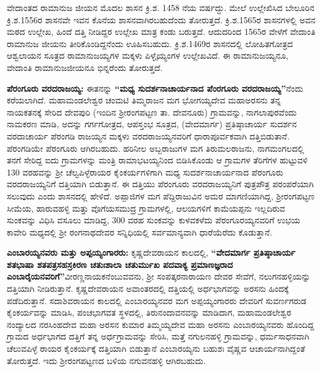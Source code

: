 ವೇದಾಂತದ ರಾಮಾನುಜ ಜೀಯನ ಮೊದಲ ಶಾಸನ ಕ್ರಿ.ಶ. 1458 ನೆಯ ವರ್ಷದ್ದು. ಮೇಲೆ ಉಲ್ಲೇಖಿಸಿದ ಬೇಲೂರಿನ ಕ್ರಿ.ಶ.1556ರ ಶಾಸನವೇ ಇವನ ಕೊನೆಯ ಶಾಸನವಾಗಿರಬಹುದೆಂದು ತೋರುತ್ತದೆ. ಕ್ರಿ.ಶ.1565ರ ಶಾಸನಗಳಲ್ಲಿ ಅವನ ಮಠದ ಉಲ್ಲೇಖ, ಹಿಂದೆ ದತ್ತಿ ನೀಡಿದ್ದರ ಉಲ್ಲೇಖ ಮಾತ್ರ ಕಂಡು ಬರುತ್ತದೆ. ಆದುದರಿಂದ 1565ರ ವೇಳೆಗೆ ವೇದಾಂತಿ ರಾಮಾನುಜ ಜೀಯನು ತೀರಿಕೊಂಡಿದ್ದನೆಂದು ಊಹಿಸಬಹುದು. ಕ್ರಿ.ಶ.1469ರ ಶಾಸನದಲ್ಲಿ ಲೋಹಿತಗೋತ್ರದ ಆಶ್ವಲಾಯನ ಸೂತ್ರದ ರಾಮಾನುಜಯ್ಯಗಳ ಮಕ್ಕಳು ಪಿಳ್ಳೈಯ್ಯಂಗಳ ಉಲ್ಲೇಖವಿದೆ. ಈ ರಾಮಾನುಜಯ್ಯನೂ, ವೇದಾಂತಿ ರಾಮಾನುಜಜೀಯನೂ ಭಿನ್ನರೆಂದು ತೋರುತ್ತದೆ.

\textbf{ಪೆರಂಗೂರು ವರದರಾಜಯ್ಯ:} ಈತನನ್ನು \textbf{“ಮಧ್ಯ ಸುದರ್ಶನಾಚಾರ್ಯನಾದ ಪೆಂರಗೂರು ವರದರಾಜಯ್ಯ”}ನೆಂದು ಕರೆಯಲಾಗಿದೆ. ಮಹಾಮಂಡಲೇಶ್ವರ ಚಂಮಟಿ ತಿಮ್ಮರಾಜನ ಮಗ ಭೋಗಯ್ಯದೇವ ಮಹಾಅರಸನು ತನ್ನ ನಾಯಕತನಕ್ಕೆ ಸೇರಿದ ದೇವಪುರಿ (ಇಂದಿನ ಶ‍್ರೀರಂಗಪಟ್ಟಣ ತಾ. ದೇವನೂರು) ಗ್ರಾಮವನ್ನು, ನಾಗಲಾಪುರವೆಂದು ನಾಮಕರಣ ಮಾಡಿ, ಅದನ್ನು ಗರ್ಗಗೋತ್ರದ, ಆಪಸ್ತಂಭ ಸೂತ್ರದ, (ವೇದಮಾರ್ಗ) ಪ್ರತಿಷ್ಠಾಚಾರ್ಯ ಸುದರ್ಶನ ವರದಾಚಾರ್ಯ ಪೆರಂಗಡಿ ರಾಜಯ್ಯನ ಮಕ್ಕಳು ವರದರಾಜಯ್ಯನವರಿಗೆ ಧಾರಾಪೂರ್ವಕವಾಗಿ ದತ್ತಿಬಿಡುತಾನೆ. ಪೆರಂಗಡಿಯೇ ಪೆರಂಗೂರು ಆಗಿರಬಹುದು. ಹರಿನೀಲ ಅಬ್ಬರಾಜುಗಳ ಮಗ ತಿರುಮಲರಾಜನು, ನಾಗಮಂಗಲದಲ್ಲಿ ತನಗೆ ಸೇರಿದ್ದ ಐದು ಗ್ರಾಮಗಳನ್ನು ಮಂತ್ರಿ ರಾಮಾಭಟಯ್ಯನಿಂದ ಬಿಡಿಸಿಕೊಂಡು ಆ ಗ್ರಾಮಗಳ ತೆರಿಗೆಗಳ ಹುಟ್ಟುವಳಿ 130 ವರಹವನ್ನು ಶ‍್ರೀ ಚೆಲ್ವಪಿಳ್ಳೆರಾಯರ ಕೈಂಕರ್ಯಗಳಿಗಾಗಿ ಮಧ್ಯ ಸುದರ್ಶನಾಚಾರ್ಯನಾದ ಪೆರಂಗೂರು ವರದರಾಜಯ್ಯನಿಗೆ ದತ್ತಿಯಾಗಿ ಬಿಡುತ್ತಾನೆ. ಈ ದತ್ತಿಯು ಪೆರಂಗೂರು ವರದರಾಜಯ್ಯನಿಗೆ ಪುತ್ರಪೌತ್ರ ಪರಂಪರೆಯಾಗಿ ಸಲುವುದು ಎಂದು ಶಾಸನದಲ್ಲಿ ಹೇಳಿದೆ. ಅಪ್ಪಾಜಿಗಳ ಮಗ ಪೆದ್ದಿರಾಜುವಿನ ಅಮರ ಮಾಗಣಿಯಾಗಿದ್ದ, ಶ‍್ರೀರಂಗಪಟ್ಟಣ ಸೀಮೆಯ, ಹಾರುವಹಳ್ಳಿ ಮತ್ತು ವೊಗೆಯಸಮುದ್ರ ಗ್ರಾಮಗಳಲ್ಲಿ, ಆಲಯಗಳಿಗೆ ಕಾಮೆಯಪ್ಪನು ಇಲ್ಲದಿರುವ ಸುಂಕವನ್ನು ವಿಧಿಸಿ ವಸೂಲು ಮಾಡಿದ್ದ, 300 ವರಹ ಸುಂಕವನ್ನು ಕುಳವಕಳೆದು ಪೆರಂಗೂರಯ್ಯನವರಿಗೆ ಉಭಯ ಕಾವೇರಿ ಮಧ್ಯದಲ್ಲಿ ಶ‍್ರೀ ರಂಗನಾಥದೇವರ ಸನ್ನಿಧಿಯಲ್ಲಿ ಸರ್ವಮಾನ್ಯವಾಗಿ ಧಾರೆಯೆರೆದು ಕೊಡುತ್ತಾನೆ.

\textbf{ಎಂಬಾರಯ್ಯನವರು ಮತ್ತು ಅಪ್ಪಯ್ಯಂಗಾರರು:} ಕೃಷ್ಣದೇವರಾಯನ ಕಾಲದಲ್ಲಿ, \textbf{“ವೇದಮಾರ್ಗ ಪ್ರತಿಷ್ಠಾಚಾರ್ಯ ಶತಭಾಷಾ ಶತಪತ್ರಸಹಸ್ರಕಿರಣ ಚತುಃಶಾಲಾ ಚತುರ್ಮುಖ ಪದವಾಕ್ಯ ಪ್ರಮಾಣಜ್ಞರಾದ ಎಂಬಾರೈಯನವರಿಗೆ”}\break ವೀರಣ್ಣನಾಯಕನೆಂಬುವವನು, ಶ‍್ರೀ ಸಂಪತ್ಕರನಾರಾಯಣ ದೇವರ ಸೇವೆಗೆ, ನಲುಗನಹಳ್ಳಿಯನ್ನು ದತ್ತಿಯಾಗಿ ನೀಡಿರುತ್ತಾನೆ. ಕೃಷ್ಣದೇವರಾಯನ ಅವಾಂತರದಲ್ಲಿ ದತ್ತಿಯಲ್ಲಿ ಅರ್ಧಭಾಗವನ್ನು ಅರಸನು ಹಿಂದಕ್ಕೆ ಪಡೆದಿರುತ್ತಾನೆ. ಸದಾಶಿವರಾಯನ ಕಾಲದಲ್ಲಿ ಎಂಬಾರಯ್ಯನವರ ಮಗ ಅಪ್ಪಯ್ಯಂಗಾರರು ದೇವರಿಗೆ ಸುವರ್ಣಗರುಡ ಕೈಂಕರ್ಯವನ್ನು ಮಾಡಿಸಿ, ಪಂಚಭಾಗವತ ಸ್ಥಳದಲ್ಲಿ, ತಿರುನಂದಾವನವನ್ನು ಮಾಡಿದಾಗ, ಮಹಾಮಂಡಲೇಶ್ವರ ನಂದ್ಯಾಲದ ನರಸಿಂಹದೇವ ಮಹಾ ಅರಸನ ಕುಮಾರ ತಿಮ್ಮಯ್ಯದೇವ ಮಹಾ ಅರಸನು ಎಂಬಾರಯ್ಯನವರು ಹೊಂದಿದ್ದ ಗ್ರಾಮದ ಅರ್ಧಭಾಗದ ದತ್ತಿಗೆ ತನ್ನ ಅರ್ಧಗ್ರಾಮವನ್ನು ಸೇರಿಸಿ, ಮತ್ತೆ ನಗುಲನಹಳ್ಳಿ ಗ್ರಾಮವನ್ನು, ಧರ್ಮಸಾಧನವಾಗಿ ಚೆಲುವಪಿಳ್ಳೆ ರಾಯರ ಕೈಂಕರ್ಯಕ್ಕೆ ದತ್ತಿಯಾಗಿ ಬಿಡುತ್ತಾನೆ ಎಂಬಾರಯ್ಯನು ಬಹುಶಃ ವೈಷ್ಣವ ಆಚಾರ್ಯನಾಗಿದ್ದಂತೆ ತೋರುತ್ತದೆ. ಇದು ಶ‍್ರೀರಂಗಪಟ್ಟಣದ ಬಳಿಯ ನಗುವನಹಳ್ಳಿ ಆಗಿರಬಹುದು.

